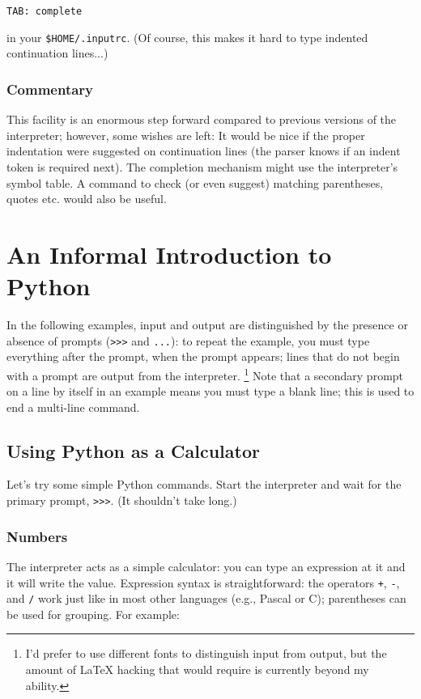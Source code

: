 \bcode\begin{verbatim}
TAB: complete
\end{verbatim}\ecode
%
in your {\tt \$HOME/.inputrc}.  (Of course, this makes it hard to type
indented continuation lines...)

\subsection{Commentary}

This facility is an enormous step forward compared to previous
versions of the interpreter; however, some wishes are left: It would
be nice if the proper indentation were suggested on continuation lines
(the parser knows if an indent token is required next).  The
completion mechanism might use the interpreter's symbol table.  A
command to check (or even suggest) matching parentheses, quotes etc.
would also be useful.


\chapter{An Informal Introduction to Python}

In the following examples, input and output are distinguished by the
presence or absence of prompts ({\tt >>>} and {\tt ...}): to repeat
the example, you must type everything after the prompt, when the
prompt appears; lines that do not begin with a prompt are output from
the interpreter.%
\footnote{
	I'd prefer to use different fonts to distinguish input
	from output, but the amount of LaTeX hacking that would require
	is currently beyond my ability.
}
Note that a secondary prompt on a line by itself in an example means
you must type a blank line; this is used to end a multi-line command.

\section{Using Python as a Calculator}

Let's try some simple Python commands.  Start the interpreter and wait
for the primary prompt, {\tt >>>}.  (It shouldn't take long.)

\subsection{Numbers}

The interpreter acts as a simple calculator: you can type an
expression at it and it will write the value.  Expression syntax is
straightforward: the operators {\tt +}, {\tt -}, {\tt *} and {\tt /}
work just like in most other languages (e.g., Pascal or C); parentheses
can be used for grouping.  For example:

